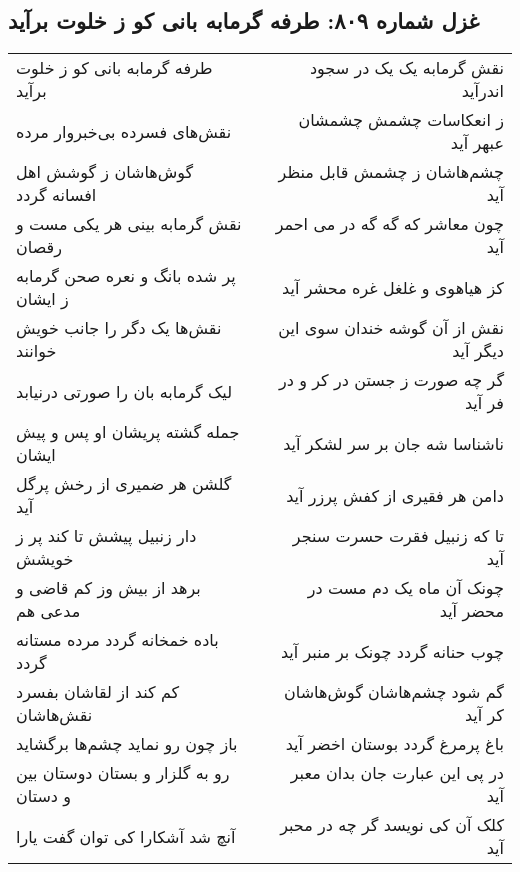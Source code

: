 \begin{center}
\section*{غزل شماره ۸۰۹: طرفه گرمابه بانی کو ز خلوت برآید}
\label{sec:0809}
\begin{longtable}{l p{0.5cm} r}
طرفه گرمابه بانی کو ز خلوت برآید
&&
نقش گرمابه یک یک در سجود اندرآید
\\
نقش‌های فسرده بی‌خبروار مرده
&&
ز انعکاسات چشمش چشمشان عبهر آید
\\
گوش‌هاشان ز گوشش اهل افسانه گردد
&&
چشم‌هاشان ز چشمش قابل منظر آید
\\
نقش گرمابه بینی هر یکی مست و رقصان
&&
چون معاشر که گه گه در می احمر آید
\\
پر شده بانگ و نعره صحن گرمابه ز ایشان
&&
کز هیاهوی و غلغل غره محشر آید
\\
نقش‌ها یک دگر را جانب خویش خوانند
&&
نقش از آن گوشه خندان سوی این دیگر آید
\\
لیک گرمابه بان را صورتی درنیابد
&&
گر چه صورت ز جستن در کر و در فر آید
\\
جمله گشته پریشان او پس و پیش ایشان
&&
ناشناسا شه جان بر سر لشکر آید
\\
گلشن هر ضمیری از رخش پرگل آید
&&
دامن هر فقیری از کفش پرزر آید
\\
دار زنبیل پیشش تا کند پر ز خویشش
&&
تا که زنبیل فقرت حسرت سنجر آید
\\
برهد از بیش وز کم قاضی و مدعی هم
&&
چونک آن ماه یک دم مست در محضر آید
\\
باده خمخانه گردد مرده مستانه گردد
&&
چوب حنانه گردد چونک بر منبر آید
\\
کم کند از لقاشان بفسرد نقش‌هاشان
&&
گم شود چشم‌هاشان گوش‌هاشان کر آید
\\
باز چون رو نماید چشم‌ها برگشاید
&&
باغ پرمرغ گردد بوستان اخضر آید
\\
رو به گلزار و بستان دوستان بین و دستان
&&
در پی این عبارت جان بدان معبر آید
\\
آنچ شد آشکارا کی توان گفت یارا
&&
کلک آن کی نویسد گر چه در محبر آید
\\
\end{longtable}
\end{center}
